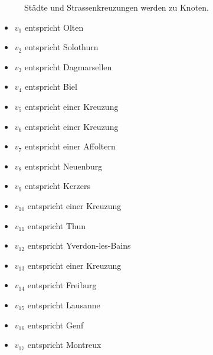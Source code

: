 \begin{enumerate}
\begin{figure}[htb]
\caption{Städte und Strassenkreuzungen werden zu Knoten.}
\label{figure-graph-map-ch-solution}
\end{figure}

\begin{multicols}{2}
\begin{itemize}
\item $v_1$ entspricht Olten
\item $v_2$ entspricht Solothurn
\item $v_3$ entspricht Dagmarsellen
\item $v_4$ entspricht Biel
\item $v_5$ entspricht einer Kreuzung
\item $v_6$ entspricht einer Kreuzung
\item $v_7$ entspricht einer Affoltern
\item $v_8$ entspricht Neuenburg
\item $v_9$ entspricht Kerzers
\item $v_{10}$ entspricht einer Kreuzung
\item $v_{11}$ entspricht Thun
\item $v_{12}$ entspricht Yverdon-les-Bains
\item $v_{13}$ entspricht einer Kreuzung
\item $v_{14}$ entspricht Freiburg
\item $v_{15}$ entspricht Lausanne
\item $v_{16}$ entspricht Genf
\item $v_{17}$ entspricht Montreux
\end{itemize}
\end{multicols}

\end{enumerate}

\newpage

